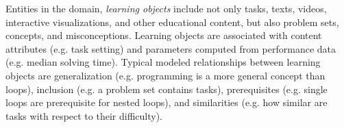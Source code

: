 Entities in the domain, \emph{learning objects} \cite{learning-objects} %
include not only tasks, texts, videos, interactive visualizations,
and other educational content,
but also problem sets, concepts, and misconceptions.
Learning objects are associated with content attributes (e.g. task setting)
and parameters computed from performance data (e.g. median solving time).
Typical modeled relationships between learning objects are
generalization (e.g. programming is a more general concept than loops),
inclusion (e.g. a problem set contains tasks),
prerequisites (e.g. single loops are prerequisite for nested loops),
and similarities (e.g. how similar are tasks with respect to their difficulty).


